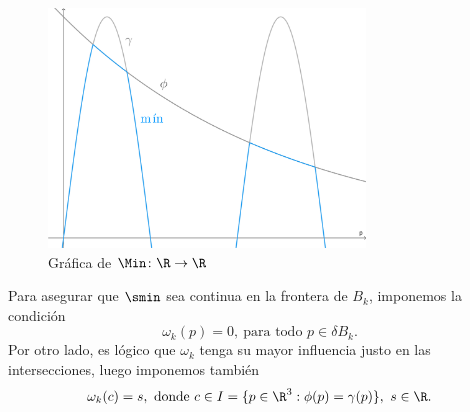 \begin{figure}[t]
    \centering
    \includegraphics[width=0.75\textwidth]{Plantilla-TFG-master/img/smooth_real.png}
    \caption{Gráfica de $\Min\colon \R\to\R$}
    \label{fig:min_real}
\end{figure}

Para asegurar que $\smin$ sea continua en la frontera de $B_{k}$, imponemos la condición 
\begin{equation*}
    \omega_k(p) = 0,\ \text{para todo } p \in \delta B_{k}.
\end{equation*}
Por otro lado, es lógico que $\omega_k$ tenga su mayor influencia justo en las intersecciones, luego imponemos también 
\begin{equation*}
    \omega_k(c) = s, \text{ donde } c \in I = \{p\in\R^3 : \phi(p) = \gamma(p)\},\ s\in \R.
\end{equation*}

